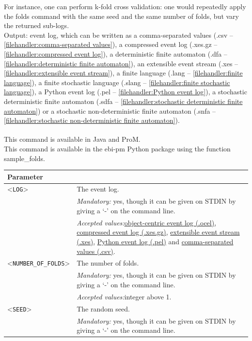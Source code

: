 { For instance, one can perform k-fold cross validation: one would repeatedly apply the folds command with the same seed and the same number of folds, but vary the returned sub-logs.\\
\noindent Output: event log, which can be written as a comma-separated values (.csv -- \cref{filehandler:comma-separated values}), a compressed event log (.xes.gz -- \cref{filehandler:compressed event log}), a deterministic finite automaton (.dfa -- \cref{filehandler:deterministic finite automaton}), an extensible event stream (.xes -- \cref{filehandler:extensible event stream}), a finite language (.lang -- \cref{filehandler:finite language}), a finite stochastic language (.slang -- \cref{filehandler:finite stochastic language}), a Python event log (.pel -- \cref{filehandler:Python event log}), a stochastic deterministic finite automaton (.sdfa -- \cref{filehandler:stochastic deterministic finite automaton}) or a stochastic non-deterministic finite automaton (.snfa -- \cref{filehandler:stochastic non-deterministic finite automaton}).\\
\\This command is available in Java and ProM.
\\This command is available in the ebi-pm Python package using the function sample\_folds.
\begin{tabularx}{\linewidth}{lX}
\toprule
Parameter \\\midrule
<\texttt{LOG}>&The event log.\\
&\textit{Mandatory:} \quad yes, though it can be given on STDIN by giving a `-' on the command line.\\
&\textit{Accepted values:}\quad \hyperref[filehandler:object-centric event log]{object-centric event log (.ocel)}, \hyperref[filehandler:compressed event log]{compressed event log (.xes.gz)}, \hyperref[filehandler:extensible event stream]{extensible event stream (.xes)}, \hyperref[filehandler:Python event log]{Python event log (.pel)} and \hyperref[filehandler:comma-separated values]{comma-separated values (.csv)}.\\
<\texttt{NUMBER\_OF\_FOLDS}>&The number of folds.\\
&\textit{Mandatory:} \quad yes, though it can be given on STDIN by giving a `-' on the command line.\\
&\textit{Accepted values:}\quad integer above 1.\\
<\texttt{SEED}>&The random seed.\\
&\textit{Mandatory:} \quad yes, though it can be given on STDIN by giving a `-' on the command line.\\

\end{tabularx}}
